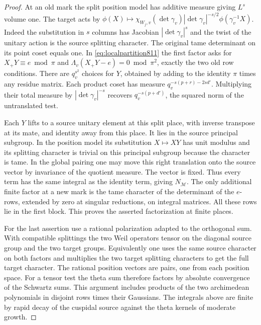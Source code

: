 \documentclass[a4paper,11pt]{article}
\theoremstyle{definition}
\theoremstyle{remark}
\numberwithin{equation}{section}
\begin{document}
\begin{proof}
At an old mark the split position model has additive measure
giving \(L^s\) volume one. The target acts by
\(\phi(X)\mapsto\chi_{W_j,v}(\det\gamma_v)
|\det\gamma_v|^{-s/2}\phi(\gamma_v^{-1}X)\).
Indeed the substitution in \(s\) columns has Jacobian
\(|\det\gamma_v|^s\) and the twist of the unitary action is
the source splitting character. The original tame determinant
on its point coset equals one. In \eqref{eq:localpartition811}
the first factor asks for \(X_+Y\equiv e\bmod\pi\) and
\(\Lambda_v(X_+Y-e)=0\bmod\pi^2\), exactly the two old row
conditions. There are \(q_v^{s^2}\) choices for \(Y\), obtained
by adding to the identity \(\pi\) times any residue matrix.
Each product coset has measure \(q_v^{-s(p+r)-2sd'}\).
Multiplying their total measure by \(|\det\gamma_v|^{-s}\)
recovers \(q_v^{-s(p+d')}\), the squared norm of the
untranslated test.

Each \(Y\) lifts to a source unitary element at this split
place, with inverse transpose at its mate, and identity away
from this place. It lies in the source principal subgroup.
In the position model its substitution \(X\mapsto XY\) has
unit modulus and its splitting character is trivial on this
principal subgroup because the character is tame. In the
global pairing one may move this right translation onto
the source vector by invariance of the quotient measure.
The vector is fixed. Thus every term has the same integral
as the identity term, giving \(N_{\mathcal M}\).
The only additional finite factor at a new mark is the tame
character of the determinant of the \(e\)-rows, extended by
zero at singular reductions, on integral matrices. All these
rows lie in the first block. This proves the asserted
factorization at finite places.

For the last assertion use a rational polarization adapted
to the orthogonal sum. With compatible splittings the two
Weil operators tensor on the diagonal source group and the
two target groups. Equivalently one uses the same source
character on both factors and multiplies the two target
splitting characters to get the full target character.
The rational position vectors are pairs, one from each
position space. For a tensor test the theta sum therefore
factors by absolute convergence of the Schwartz sums.
This argument includes products of the two archimedean
polynomials in disjoint rows times their Gaussians. The
integrals above are finite by rapid decay of the cuspidal
source against the theta kernels of moderate growth.
\end{proof}
\end{document}
